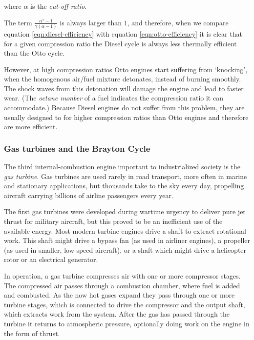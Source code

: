 where \(\alpha \) is the \textit{cut-off ratio}. 

The term \( \frac{\alpha^{\gamma}-1}{\gamma(\alpha-1)} \) is always larger
than \(1 \), and therefore, when we compare equation \ref{eqn:diesel-efficiency}
with equation \ref{eqn:otto-efficiency} it is clear that for a given
compression ratio the Diesel cycle is always less thermally efficient than the
Otto cycle. 

However, at high compression ratios Otto engines start suffering from
`knocking', when the homogenous air/fuel mixture detonates, instead of burning
smoothly. The shock waves from this detonation will damage the engine and lead
to faster wear. (The \textit{octane number} of a fuel indicates the compression
ratio it can accommodate.) Because Diesel engines do not suffer from this
problem, they are usually designed to for higher compression ratios
than Otto engines and therefore are more efficient.

\subsubsection{Gas turbines and the Brayton Cycle}

The third internal\hyp{}combustion engine important to industrialized society is
the \textit{gas turbine}. Gas turbines are used rarely in road transport, more
often in marine and stationary applications, but thousands take to the sky
every day, propelling aircraft \autocite{Morris2017} carrying billions of airline
passengers every year.

The first gas turbines were developed during wartime urgency to deliver pure jet
thrust for military aircraft, but this proved to be an inefficient use of the
available energy. Most modern turbine engines drive a shaft to extract
rotational work. This shaft might drive a bypass fan (as used in airliner engines), a
propeller (as used in smaller, low-speed aircraft), or a shaft which might drive
a helicopter rotor or an electrical generator.

In operation, a gas turbine compresses air with one or more compressor stages.
The compressed air passes through a combustion chamber, where fuel is added and
combusted. As the now hot gases expand they pass through one or more turbine
stages, which is connected to drive the compressor and the output shaft, which
extracts work from the system. After the gas has passed through the turbine it
returns to atmospheric pressure, optionally doing work on the engine in the form
of thrust.

